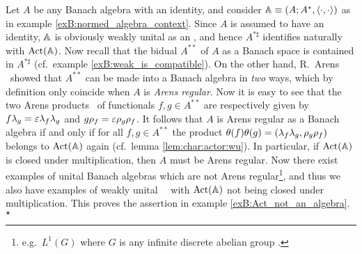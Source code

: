 {\small
\begin{exB} \rm
Let $A$ be any Banach algebra with an identity, and consider $\mathbb{A}\equiv (A; A^*, \langle\cdot, \cdot\rangle)$
as in example \ref{exB:normed_algebra_context}\@.
Since $A$ is assumed to have an identity, $\mathbb{A}$ is obviously weakly unital as an \context,
and hence $A^{*\sharp}$ identifies naturally with $\mbox{\rm Act}(\mathbb{A})$.
Now recall that the bidual $A^{**}$ of $A$ as a Banach space is contained in $A^{*\sharp}$
(cf.\ example \ref{exB:weak_is_compatible}).
On the other hand, R.\ Arens \cite{Arens}\ showed that $A^{**}$ can be made into a Banach algebra
in {\em two\/} ways, which by definition only coincide when $A$ is {\em Arens regular}\@.
Now it is easy to see that the two Arens products \cite{Arens,Bonsall_Duncan,civin_yood}\
of functionals $f,g \in A^{**}$ are respectively given by $f \lambda_g = \varepsilon \lambda_f \lambda_g$ and
$g \rho_f = \varepsilon \rho_g \rho_f$.
It follows that $A$ is Arens regular as a Banach algebra if and only if
for all $f,g \in A^{**}$ the product $\theta(f)\theta(g) = (\lambda_f \lambda_g, \rho_g \rho_f)$
belongs to $\mbox{\rm Act}(\mathbb{A})$ again (cf.\ lemma \ref{lem:char:actor:wu}).
In particular, if $\mbox{\rm Act}(\mathbb{A})$ is closed under multiplication, then $A$ must be Arens regular.
Now there exist examples of unital Banach algebras which are not Arens
regular\footnote{e.g.\ $L^1(G)$ where $G$ is any infinite discrete abelian group
\cite{civin_yood}\@.}, and thus we also have examples of weakly unital \contexts\ \Aa\
with $\mbox{\rm Act}(\mathbb{A})$ not being closed under multiplication.
This proves the assertion in example \ref{exB:Act_not_an_algebra}\@.
\hfill $\star$
\end{exB}
}
